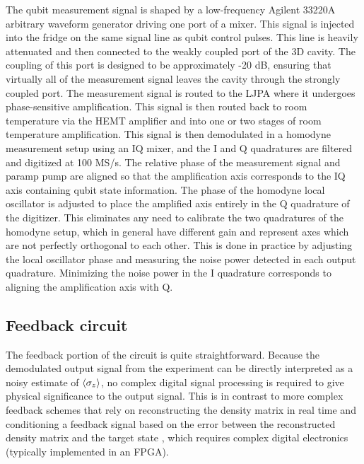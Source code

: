 The qubit measurement signal is shaped by a low-frequency Agilent 33220A arbitrary waveform generator driving one port of a mixer.  This signal is injected into the fridge on the same signal line as qubit control pulses.  This line is heavily attenuated and then connected to the weakly coupled port of the 3D cavity.  The coupling of this port is designed to be approximately -20 dB, ensuring that virtually all of the measurement signal leaves the cavity through the strongly coupled port.  The measurement signal is routed to the LJPA where it undergoes phase-sensitive amplification.  This signal is then routed back to room temperature via the HEMT amplifier and into one or two stages of room temperature amplification.  This signal is then demodulated in a homodyne measurement setup using an IQ mixer, and the I and Q quadratures are filtered and digitized at 100 MS/s.  The relative phase of the measurement signal and paramp pump are aligned so that the amplification axis corresponds to the IQ axis containing qubit state information.  The phase of the homodyne local oscillator is adjusted to place the amplified axis entirely in the Q quadrature of the digitizer.  This eliminates any need to calibrate the two quadratures of the homodyne setup, which in general have different gain and represent axes which are not perfectly orthogonal to each other.  This is done in practice by adjusting the local oscillator phase and measuring the noise power detected in each output quadrature.  Minimizing the noise power in the I quadrature corresponds to aligning the amplification axis with Q.


\subsection{Feedback circuit}

The feedback portion of the circuit is quite straightforward.  Because the demodulated output signal from the experiment can be directly interpreted as a noisy estimate of $\langle\sigma_z\rangle$, no complex digital signal processing is required to give physical significance to the output signal.  This is in contrast to more complex feedback schemes that rely on reconstructing the density matrix in real time and conditioning a feedback signal based on the error between the reconstructed density matrix and the target state \cite{PhysRevA.69.052324,Zhang2005}, which requires complex digital electronics (typically implemented in an FPGA).

